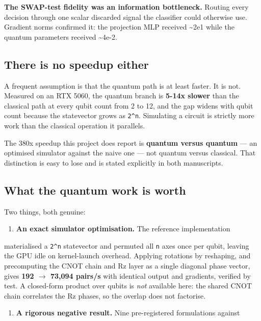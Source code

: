 \documentclass[11pt,a4paper]{article}
\begin{document}
\textbf{The SWAP-test fidelity was an information bottleneck.} Routing every decision
through one scalar discarded signal the classifier could otherwise use. Gradient
norms confirmed it: the projection MLP received \textasciitilde{}2e1 while the quantum
parameters received \textasciitilde{}4e-2.

\subsection*{There is no speedup either}

A frequent assumption is that the quantum path is at least faster. It is not.
Measured on an RTX 5060, the quantum branch is \textbf{5-14x slower} than the
classical path at every qubit count from 2 to 12, and the gap widens with qubit
count because the statevector grows as \texttt{2\textasciicircum{}n}. Simulating a circuit is strictly
more work than the classical operation it parallels.

The 380x speedup this project does report is \textbf{quantum versus quantum} — an
optimised simulator against the naive one — not quantum versus classical. That
distinction is easy to lose and is stated explicitly in both manuscripts.

\subsection*{What the quantum work is worth}

Two things, both genuine:

\begin{enumerate}\setlength{\itemsep}{2pt}
\item \textbf{An exact simulator optimisation.} The reference implementation
\end{enumerate}

   materialised a \texttt{2\textasciicircum{}n} statevector and permuted all \texttt{n} axes once per qubit,
   leaving the GPU idle on kernel-launch overhead. Applying rotations by
   reshaping, and precomputing the CNOT chain and Rz layer as a single diagonal
   phase vector, gives \textbf{192 $\rightarrow$ 73,094 pairs/s} with identical output and
   gradients, verified by test. A closed-form product over qubits is \emph{not}
   available here: the shared CNOT chain correlates the Rz phases, so the
   overlap does not factorise.

\begin{enumerate}\setlength{\itemsep}{2pt}
\item \textbf{A rigorous negative result.} Nine pre-registered formulations against
\end{enumerate}
\end{document}
